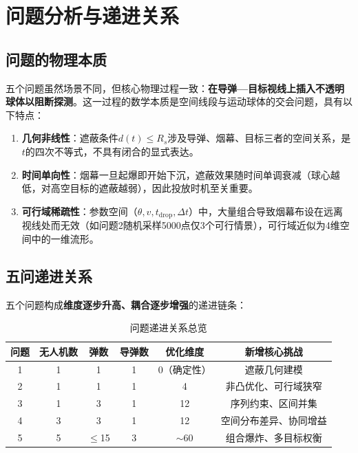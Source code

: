 \documentclass[12pt,a4paper]{ctexart}
\begin{document}
\section{问题分析与递进关系}

\subsection{问题的物理本质}

五个问题虽然场景不同，但核心物理过程一致：\textbf{在导弹—目标视线上插入不透明球体以阻断探测}。这一过程的数学本质是空间线段与运动球体的交会问题，具有以下特点：

\begin{enumerate}[label=(\arabic*)]
    \item \textbf{几何非线性}：遮蔽条件$d(t)\leq R_s$涉及导弹、烟幕、目标三者的空间关系，是$t$的四次不等式，不具有闭合的显式表达。
    \item \textbf{时间单向性}：烟幕一旦起爆即开始下沉，遮蔽效果随时间单调衰减（球心越低，对高空目标的遮蔽越弱），因此投放时机至关重要。
    \item \textbf{可行域稀疏性}：参数空间（$\theta, v, t_{\text{drop}}, \Delta t$）中，大量组合导致烟幕布设在远离视线处而无效（如问题2随机采样5000点仅3个可行情景），可行域近似为4维空间中的一维流形。
\end{enumerate}

\subsection{五问递进关系}

五个问题构成\textbf{维度逐步升高、耦合逐步增强}的递进链条：

\begin{table}[H]
\centering
\caption{问题递进关系总览}
\begin{tabular}{c|c|c|c|c|c}
\toprule
\textbf{问题} & \textbf{无人机数} & \textbf{弹数} & \textbf{导弹数} & \textbf{优化维度} & \textbf{新增核心挑战} \\
\midrule
1 & 1 & 1 & 1 & 0（确定性） & 遮蔽几何建模 \\
2 & 1 & 1 & 1 & 4 & 非凸优化、可行域狭窄 \\
3 & 1 & 3 & 1 & 12 & 序列约束、区间并集 \\
4 & 3 & 3 & 1 & 12 & 空间分布差异、协同增益 \\
5 & 5 & $\leq$15 & 3 & $\sim$60 & 组合爆炸、多目标权衡 \\
\bottomrule
\end{tabular}
\end{table}
\end{document}
